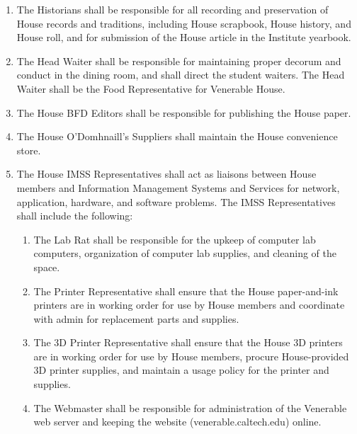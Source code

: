 \documentclass[10pt]{article} %
\begin{document}
\begin{enumerate}
\item The Historians shall be responsible for all recording and preservation of House records and traditions, including House scrapbook, House history, and House roll, and for submission of the House article in the Institute yearbook.
\item The Head Waiter shall be responsible for maintaining proper decorum and conduct in the dining room, and shall direct the student waiters. The Head Waiter shall be the Food Representative for Venerable House.
\item The House BFD Editors shall be responsible for publishing the House paper.
\item The House O’Domhnaill’s Suppliers shall maintain the House convenience store.
\item The House IMSS Representatives shall act as liaisons between House members and Information Management Systems and Services for network, application, hardware, and software problems. The IMSS Representatives shall include the following:
\begin{enumerate}
	\item The Lab Rat shall be responsible for the upkeep of computer lab computers, organization of computer lab supplies, and cleaning of the space.
	\item The Printer Representative shall ensure that the House paper-and-ink printers are in working order for use by House members and coordinate with admin for replacement parts and supplies.
	\item The 3D Printer Representative shall ensure that the House 3D printers are in working order for use by House members, procure House-provided 3D printer supplies, and maintain a usage policy for the printer and supplies.
	\item The Webmaster shall be responsible for administration of the Venerable web server and keeping the website (venerable.caltech.edu) online.
\end{enumerate}
\end{enumerate}
\end{document}
